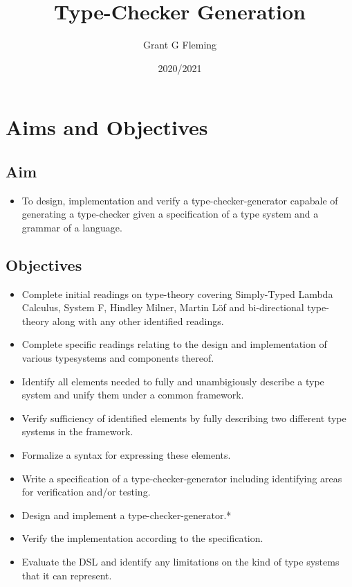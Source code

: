 \documentclass{ProgressReport}[2020/09/15]
\title{Type-Checker Generation}
\author{Grant G Fleming}
\date{2020/2021}
\begin{document}
        \maketitle
	\tableofcontents
        
        \chapter{Aims and Objectives}

        \section{Aim}

        \begin{itemize}
          \item To design, implementation and verify a
            type-checker-generator capabale of generating a
            type-checker given a specification of a type system and a
            grammar of a language. 
        \end{itemize}
        
        \section{Objectives}

        \begin{itemize}
          \item Complete initial readings on type-theory covering
            Simply-Typed Lambda Calculus, System F, Hindley Milner,
            Martin L\"{o}f and bi-directional type-theory along with
            any other identified readings.
          \item Complete specific readings relating to the design and
            implementation of various typesystems and components thereof.
          \item Identify all elements needed to fully and
            unambigiously describe a type system and unify them under
            a common framework.
          \item Verify sufficiency of identified elements by fully describing
            two different type systems in the framework.
          \item Formalize a syntax for expressing these elements.
          \item Write a specification of a type-checker-generator
            including identifying areas for verification and/or
            testing. 
          \item Design and implement a type-checker-generator.*
          \item Verify the implementation according to the
            specification.
          \item Evaluate the DSL and identify any limitations on the
            kind of type systems that it can represent.
        \end{itemize}
\end{document}
